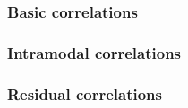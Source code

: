 
\subsubsection{Basic correlations}
\subsubsection{Intramodal correlations}
\subsubsection{Residual correlations}
